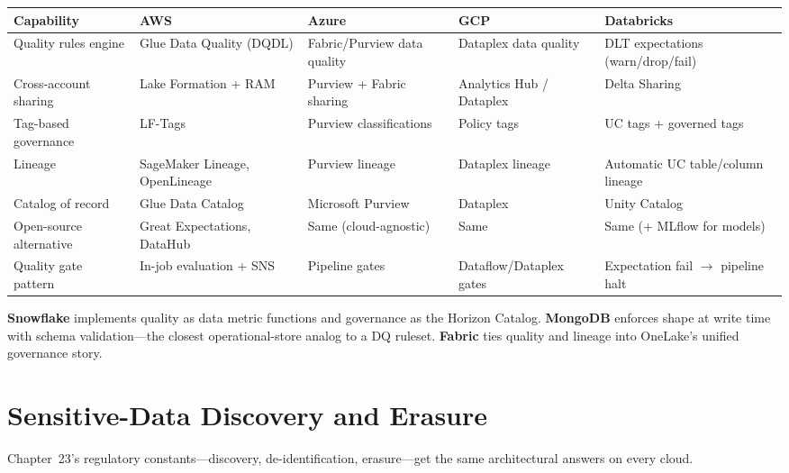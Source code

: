 \begin{center}
\footnotesize
\begin{tabular}{@{}p{2.4cm}p{2.9cm}p{2.9cm}p{2.9cm}p{2.9cm}@{}}
\toprule
\textbf{Capability} & \textbf{AWS} & \textbf{Azure} & \textbf{GCP} & \textbf{Databricks} \\
\midrule
Quality rules engine & Glue Data Quality (DQDL) & Fabric/Purview data quality & Dataplex data quality & DLT expectations (warn/drop/fail) \\
Cross-account sharing & Lake Formation + RAM & Purview + Fabric sharing & Analytics Hub / Dataplex & Delta Sharing \\
Tag-based governance & LF-Tags & Purview classifications & Policy tags & UC tags + governed tags \\
Lineage & SageMaker Lineage, OpenLineage & Purview lineage & Dataplex lineage & Automatic UC table/column lineage \\
Catalog of record & Glue Data Catalog & Microsoft Purview & Dataplex & Unity Catalog \\
\addlinespace
Open-source alternative & Great Expectations, DataHub & Same (cloud-agnostic) & Same & Same (+ MLflow for models) \\
Quality gate pattern & In-job evaluation + SNS & Pipeline gates & Dataflow/Dataplex gates & Expectation fail $\rightarrow$ pipeline halt \\
\bottomrule
\end{tabular}
\end{center}

\noindent \textbf{Snowflake} implements quality as data metric functions and governance as the
Horizon Catalog. \textbf{MongoDB} enforces shape at write time with schema validation---the
closest operational-store analog to a DQ ruleset. \textbf{Fabric} ties quality and lineage into
OneLake's unified governance story.

\section{Sensitive-Data Discovery and Erasure}
%
Chapter~23's regulatory constants---discovery, de-identification, erasure---get the same
architectural answers on every cloud.

